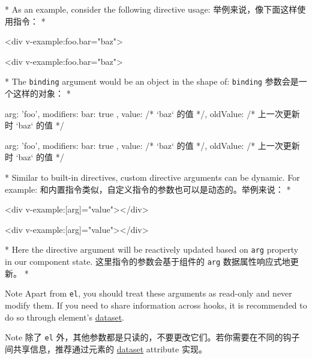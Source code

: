 \begin{paracol}{2}
 
\switchcolumn[0]*%
As an example, consider the following directive usage:
\switchcolumn
举例来说，像下面这样使用指令：
\switchcolumn[0]*%
\begin{codeHtml}
<div v-example:foo.bar="baz">
\end{codeHtml}
\switchcolumn
\begin{codeHtml}
<div v-example:foo.bar="baz">
\end{codeHtml}
\switchcolumn[0]*%
The \texttt{binding} argument would be an object in the shape of:
\switchcolumn
\texttt{binding} 参数会是一个这样的对象：
\switchcolumn[0]*%
\begin{codeJs}
{
  arg: 'foo',
  modifiers: { bar: true },
  value: /* `baz` 的值 */,
  oldValue: /* 上一次更新时 `baz` 的值 */
}
\end{codeJs}
\switchcolumn
\begin{codeJs}
{
  arg: 'foo',
  modifiers: { bar: true },
  value: /* `baz` 的值 */,
  oldValue: /* 上一次更新时 `baz` 的值 */
}
\end{codeJs}
\switchcolumn[0]*%
Similar to built-in directives, custom directive arguments can be
dynamic. For example:
\switchcolumn
和内置指令类似，自定义指令的参数也可以是动态的。举例来说：
\switchcolumn[0]*%
\begin{codeHtml}
<div v-example:[arg]="value"></div>
\end{codeHtml}
\switchcolumn
\begin{codeHtml}
<div v-example:[arg]="value"></div>
\end{codeHtml}
\switchcolumn[0]*%
Here the directive argument will be reactively updated based on
\texttt{arg} property in our component state.
\switchcolumn
这里指令的参数会基于组件的 \texttt{arg} 数据属性响应式地更新。
\switchcolumn[0]*%
\begin{vueQuote}{Note}
Apart from \texttt{el}, you should treat these arguments as read-only
and never modify them. If you need to share information across hooks, it
is recommended to do so through element's
\href{https://developer.mozilla.org/en-US/docs/Web/API/HTMLElement/dataset}{dataset}.
\end{vueQuote} 
\switchcolumn
\begin{vueQuote}{Note}
除了 \texttt{el}
外，其他参数都是只读的，不要更改它们。若你需要在不同的钩子间共享信息，推荐通过元素的
\href{https://developer.mozilla.org/en-US/docs/Web/API/HTMLElement/dataset}{dataset}
attribute 实现。
\end{vueQuote} 
\end{paracol}

